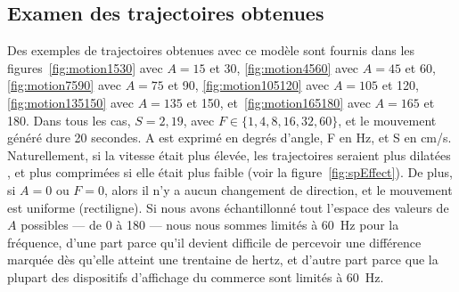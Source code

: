 	\FloatBarrier \subsection{Examen des trajectoires obtenues}
	Des exemples de trajectoires obtenues avec ce modèle sont fournis dans les figures~\ref{fig:motion1530} avec $A=15$ et 30, \ref{fig:motion4560} avec $A=45$ et 60, \ref{fig:motion7590} avec $A=75$ et 90, \ref{fig:motion105120} avec $A=105$ et 120, \ref{fig:motion135150} avec $A=135$ et 150, et~\ref{fig:motion165180} avec $A=165$ et 180. Dans tous les cas, $S=2,19$, avec $F \in \{1,4,8,16,32,60\}$, et le mouvement généré dure 20 secondes. A est exprimé en degrés d'angle, F en Hz, et S en cm/s. Naturellement, si la vitesse était plus élevée, les trajectoires seraient plus \og dilatées \fg{}, et plus \og comprimées \fg{} si elle était plus faible (voir la figure~\ref{fig:spEffect}). De plus, si $A=0$ ou $F=0$, alors il n'y a aucun changement de direction, et le mouvement est uniforme (rectiligne). Si nous avons échantillonné tout l'espace des valeurs de $A$ possibles --- de 0 à 180\textdegree{} --- nous nous sommes limités à 60~Hz pour la fréquence, d'une part parce qu'il devient difficile de percevoir une différence marquée dès qu'elle atteint une trentaine de hertz, et d'autre part parce que la plupart des dispositifs d'affichage du commerce sont limités à 60~Hz.	
	
